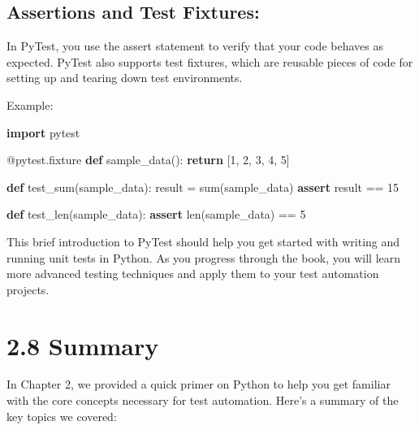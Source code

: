 \documentclass[
  paper=a4,
  ,captions=tableheading
]{scrartcl}
\newenvironment{Shaded}{}{}
\newcommand{\AttributeTok}[1]{\textcolor[rgb]{0.49,0.56,0.16}{#1}}
\newcommand{\BuiltInTok}[1]{\textcolor[rgb]{0.00,0.50,0.00}{#1}}
\newcommand{\ControlFlowTok}[1]{\textcolor[rgb]{0.00,0.44,0.13}{\textbf{#1}}}
\newcommand{\DecValTok}[1]{\textcolor[rgb]{0.25,0.63,0.44}{#1}}
\newcommand{\ImportTok}[1]{\textcolor[rgb]{0.00,0.50,0.00}{\textbf{#1}}}
\newcommand{\KeywordTok}[1]{\textcolor[rgb]{0.00,0.44,0.13}{\textbf{#1}}}
\newcommand{\NormalTok}[1]{#1}
\newcommand{\OperatorTok}[1]{\textcolor[rgb]{0.40,0.40,0.40}{#1}}
\begin{document}
\hypertarget{assertions-and-test-fixtures}{%
\subsection{Assertions and Test
Fixtures:}\label{assertions-and-test-fixtures}}

In PyTest, you use the assert statement to verify that your code behaves
as expected. PyTest also supports test fixtures, which are reusable
pieces of code for setting up and tearing down test environments.

Example:

\begin{Shaded}
\begin{Highlighting}[]
\ImportTok{import}\NormalTok{ pytest}

\AttributeTok{@pytest.fixture}
\KeywordTok{def}\NormalTok{ sample\_data():}
    \ControlFlowTok{return}\NormalTok{ [}\DecValTok{1}\NormalTok{, }\DecValTok{2}\NormalTok{, }\DecValTok{3}\NormalTok{, }\DecValTok{4}\NormalTok{, }\DecValTok{5}\NormalTok{]}

\KeywordTok{def}\NormalTok{ test\_sum(sample\_data):}
\NormalTok{    result }\OperatorTok{=} \BuiltInTok{sum}\NormalTok{(sample\_data)}
    \ControlFlowTok{assert}\NormalTok{ result }\OperatorTok{==} \DecValTok{15}

\KeywordTok{def}\NormalTok{ test\_len(sample\_data):}
    \ControlFlowTok{assert} \BuiltInTok{len}\NormalTok{(sample\_data) }\OperatorTok{==} \DecValTok{5}
\end{Highlighting}
\end{Shaded}

This brief introduction to PyTest should help you get started with
writing and running unit tests in Python. As you progress through the
book, you will learn more advanced testing techniques and apply them to
your test automation projects.

\hypertarget{summary-1}{%
\section{2.8 Summary}\label{summary-1}}

In Chapter 2, we provided a quick primer on Python to help you get
familiar with the core concepts necessary for test automation. Here's a
summary of the key topics we covered:
\end{document}
